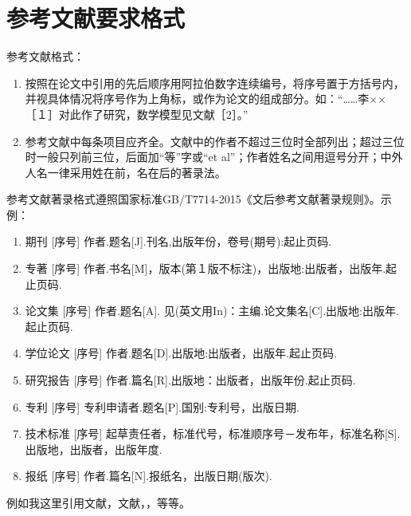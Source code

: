 \chapter{参考文献要求格式}

参考文献格式：
\begin{enumerate}[label=\arabic*.~~]
      \item 按照在论文中引用的先后顺序用阿拉伯数字连续编号，将序号置于方括号内，并视具体情况将序号作为上角标，或作为论文的组成部分。如：“……李××［１］对此作了研究，数学模型见文献［2］。”
      \item 参考文献中每条项目应齐全。文献中的作者不超过三位时全部列出；超过三位时一般只列前三位，后面加“等”字或“et al”；作者姓名之间用逗号分开；中外人名一律采用姓在前，名在后的著录法。
\end{enumerate}

参考文献著录格式遵照国家标准GB/T7714-2015《文后参考文献著录规则》。示例：
\begin{enumerate}[label=（\arabic*）]
      \item 期刊
            [序号] 作者.题名[J].刊名,出版年份，卷号(期号):起止页码.
      \item 专著
            [序号] 作者.书名[M]，版本(第１版不标注)，出版地:出版者，出版年.起止页码.
      \item 论文集
            [序号] 作者.题名[A]. 见(英文用In)：主编.论文集名[C].出版地:出版年.起止页码.
      \item 学位论文
            [序号] 作者.题名[D].出版地:出版者，出版年.起止页码.
      \item 研究报告
            [序号] 作者.篇名[R].出版地：出版者，出版年份.起止页码.
      \item 专利
            [序号] 专利申请者.题名[P].国别:专利号，出版日期.
      \item 技术标准
            [序号] 起草责任者，标准代号，标准顺序号－发布年，标准名称[S].出版地，出版者，出版年度.
      \item 报纸
            [序号] 作者.篇名[N].报纸名，出版日期(版次).
\end{enumerate}

例如我这里引用文献\cite{2001Applying}，文献\cite{2004PSO_ZhangLibiao}，\cite{2005Improve_JinYixiong}，\cite{2021A}等等。
